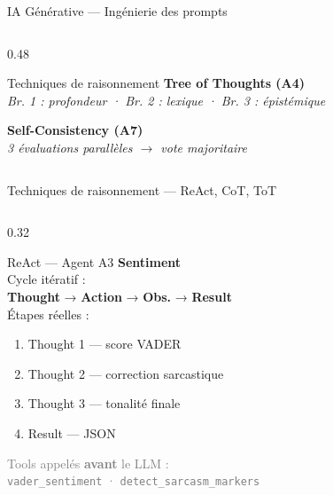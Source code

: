\documentclass[aspectratio=169, 12pt]{beamer}
\begin{document}
\begin{frame}{IA Générative — Ingénierie des prompts}
\begin{columns}[T]
\begin{column}{0.48\textwidth}
\begin{block}{Techniques de raisonnement}
        \textbf{Tree of Thoughts (A4)} \\
        \textit{Br. 1 : profondeur · Br. 2 : lexique · Br. 3 : épistémique}
        \vspace{0.15cm}

        \textbf{Self-Consistency (A7)} \\
        \textit{3 évaluations parallèles $\rightarrow$ vote majoritaire}
      \end{block}
    \end{column}
  \end{columns}
\end{frame}

\begin{frame}{Techniques de raisonnement — ReAct, CoT, ToT}

  \begin{columns}[T]

    \begin{column}{0.32\textwidth}
      \begin{block}{ReAct — Agent A3}
        \small\textbf{Sentiment}\\[0.3em]
        \scriptsize
        Cycle itératif :\\
        \textbf{Thought} → \textbf{Action} → \textbf{Obs.} → \textbf{Result}\\[0.4em]
        Étapes réelles :
        \begin{enumerate}\setlength{\itemsep}{1pt}
          \item Thought 1 — score VADER
          \item Thought 2 — correction sarcastique
          \item Thought 3 — tonalité finale
          \item Result — JSON
        \end{enumerate}
        \vspace{0.2cm}
        \textcolor{gray}{\tiny Tools appelés \textbf{avant} le LLM :\\
        \texttt{vader\_sentiment} · \texttt{detect\_sarcasm\_markers}}
      \end{block}
    \end{column}


\end{columns}
\end{frame}
\end{document}
